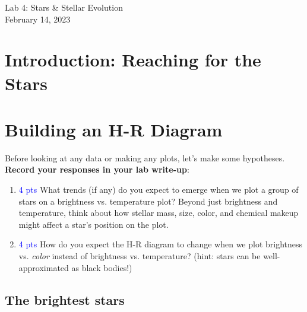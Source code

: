 \documentclass[11pt]{article}
\begin{document}
\begin{center}
\huge{Lab 4: Stars \& Stellar Evolution}\\ \medskip \Large{February 14, 2023}
\end{center}

\section{Introduction: Reaching for the Stars}

\section{Building an H-R Diagram}
Before looking at any data or making any plots, let's make some hypotheses. \textbf{Record your responses in your lab write-up}:
\begin{enumerate}
    \item \textcolor{blue}{4 pts} What trends (if any) do you expect to emerge when we plot a group of stars on a brightness vs. temperature plot? Beyond just brightness and temperature, think about how stellar mass, size, color, and chemical makeup might affect a star's position on the plot.
    
    \item \textcolor{blue}{4 pts} How do you expect the H-R diagram to change when we plot brightness vs. \emph{color} instead of brightness vs. temperature? (hint: stars can be well-approximated as black bodies!) 
    
\end{enumerate}

\subsection{The brightest stars}
\end{document}
